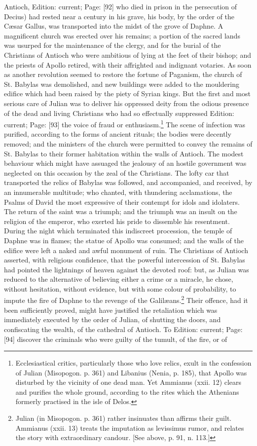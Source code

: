 Antioch, Edition: current; Page: [92] who died in prison in the persecution of Decius) had rested near a century in his grave, his body, by the order of the Cæsar Gallus, was transported into the midst of the grove of Daphne. A magnificent church was erected over his remains; a portion of the sacred lands was usurped for the maintenance of the clergy, and for the burial of the Christians of Antioch who were ambitious of lying at the feet of their bishop; and the priests of Apollo retired, with their affrighted and indignant votaries. As soon as another revolution seemed to restore the fortune of Paganism, the church of St. Babylas was demolished, and new buildings were added to the mouldering edifice which had been raised by the piety of Syrian kings. But the first and most serious care of Julian was to deliver his oppressed deity from the odious presence of the dead and living Christians who had so effectually suppressed Edition: current; Page: [93] the voice of fraud or enthusiasm.\footnote{Ecclesiastical critics, particularly those who love relics, exult in the confession of Julian (Misopogon. p. 361) and Libanius (Nenia, p. 185), that Apollo was disturbed by the vicinity of one dead man. Yet Ammianus (xxii. 12) clears and purifies the whole ground, according to the rites which the Athenians formerly practised in the isle of Delos.} The scene of infection was purified, according to the forms of ancient rituals; the bodies were decently removed; and the ministers of the church were permitted to convey the remains of St. Babylas to their former habitation within the walls of Antioch. The modest behaviour which might have assuaged the jealousy of an hostile government was neglected on this occasion by the zeal of the Christians. The lofty car that transported the relics of Babylas was followed, and accompanied, and received, by an innumerable multitude; who chanted, with thundering acclamations, the Psalms of David the most expressive of their contempt for idols and idolaters. The return of the saint was a triumph; and the triumph was an insult on the religion of the emperor, who exerted his pride to dissemble his resentment. During the night which terminated this indiscreet procession, the temple of Daphne was in flames; the statue of Apollo was consumed; and the walls of the edifice were left a naked and awful monument of ruin. The Christians of Antioch asserted, with religious confidence, that the powerful intercession of St. Babylas had pointed the lightnings of heaven against the devoted roof: but, as Julian was reduced to the alternative of believing either a crime or a miracle, he chose, without hesitation, without evidence, but with some colour of probability, to impute the fire of Daphne to the revenge of the Galilæans.\footnote{Julian (in Misopogon. p. 361) rather insinuates than affirms their guilt. Ammianus (xxii. 13) treats the imputation as levissimus rumor, and relates the story with extraordinary candour. [See above, p. 91, n. 113.]} Their offence, had it been sufficiently proved, might have justified the retaliation which was immediately executed by the order of Julian, of shutting the doors, and confiscating the wealth, of the cathedral of Antioch. To Edition: current; Page: [94] discover the criminals who were guilty of the tumult, of the fire, or of 